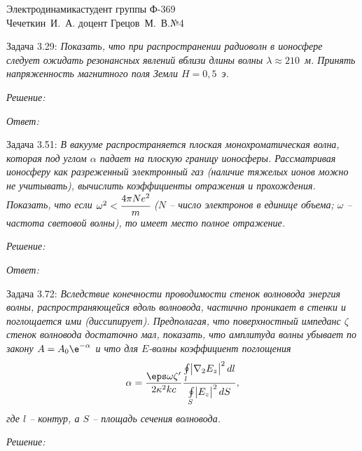 





\newcommand{\ds}{\displaystyle}


{Электродинамика}{студент группы Ф-369\\Чечеткин~И.~А.}
{доцент Грецов~М.~В.}{№4}

Задача 3.29: \emph{Показать, что при распространении радиоволн в ионосфере
следует ожидать  резонансных явлений вблизи длины волны
\( \lambda \approx 210 \)~м. Принять напряженность магнитного поля Земли
\( H = 0,5 \)~э.}

\vspace*{2em}
\emph{Решение:}

\vspace*{2em}   
\emph{Ответ:}

\newpage
Задача 3.51: \emph{В вакууме распространяется плоская монохроматическая волна,
которая под углом \( \alpha \) падает на плоскую границу ионосферы.
Рассматривая ионосферу как разреженный электронный газ (наличие тяжелых ионов
можно не учитывать), вычислить коэффициенты отражения и прохождения. Показать,
что если \( \omega^2 < \cfrac{4\pi Ne^2}{m} \) (\( N \) -- число электронов в
единице объема; \( \omega \) -- частота световой волны), то имеет место полное
отражение.}

\vspace*{2em}
\emph{Решение:}

\vspace*{2em}   
\emph{Ответ:}

\pagebreak
Задача 3.72: \emph{Вследствие конечности проводимости стенок волновода энергия
волны, распространяющейся вдоль волновода, частично проникает в стенки и
поглощается ими (диссипирует). Предполагая, что поверхностный импеданс
\( \zeta \) стенок волновода достаточно мал, показать, что амплитуда волны
убывает по закону \( A = A_0\e^{-\alpha} \) и что для \( E \)-волны коэффициент
поглощения
\[
    \alpha = \frac{\eps\omega\zeta'}{2\kappa^2 kc} \frac{\oint\limits_l
    \bigr|\nabla_2 E_z\bigl|^2\,dl}{\oint\limits_S \bigr|E_z\bigl|^2\,dS},
\]
где \( l \) -- контур, а \( S \) -- площадь сечения волновода.}

\vspace*{2em}
\emph{Решение:}

